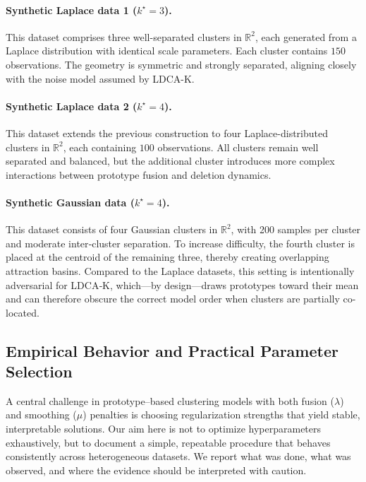 \documentclass[11pt]{article}
\theoremstyle{definition}
\newcommand{\1}{\mathbf{1}}
\begin{document}
\paragraph{Synthetic Laplace data 1 ($k^\star=3$).}
This dataset comprises three well-separated clusters in $\mathbb{R}^2$, each generated from a Laplace distribution with identical scale parameters. Each cluster contains $150$ observations. The geometry is symmetric and strongly separated, aligning closely with the noise model assumed by LDCA-K.

\paragraph{Synthetic Laplace data 2 ($k^\star=4$).}
This dataset extends the previous construction to four Laplace-distributed clusters in $\mathbb{R}^2$, each containing $100$ observations. All clusters remain well separated and balanced, but the additional cluster introduces more complex interactions between prototype fusion and deletion dynamics.

\paragraph{Synthetic Gaussian data ($k^\star=4$).}
This dataset consists of four Gaussian clusters in $\mathbb{R}^2$, with 200 samples per cluster and moderate inter‑cluster separation. To increase difficulty, the fourth cluster is placed at the centroid of the remaining three, thereby creating overlapping attraction basins. Compared to the Laplace datasets, this setting is intentionally adversarial for LDCA‑K, which—by design—draws prototypes toward their mean and can therefore obscure the correct model order when clusters are partially co-located.


\subsection{Empirical Behavior and Practical Parameter Selection}

A central challenge in prototype--based clustering models with both fusion
($\lambda$) and smoothing ($\mu$) penalties is choosing regularization
strengths that yield stable, interpretable solutions. Our aim here is
not to optimize hyperparameters exhaustively, but to document a simple,
repeatable procedure that behaves consistently across heterogeneous datasets.
We report what was done, what was observed, and where the evidence should be
interpreted with caution.
\end{document}
